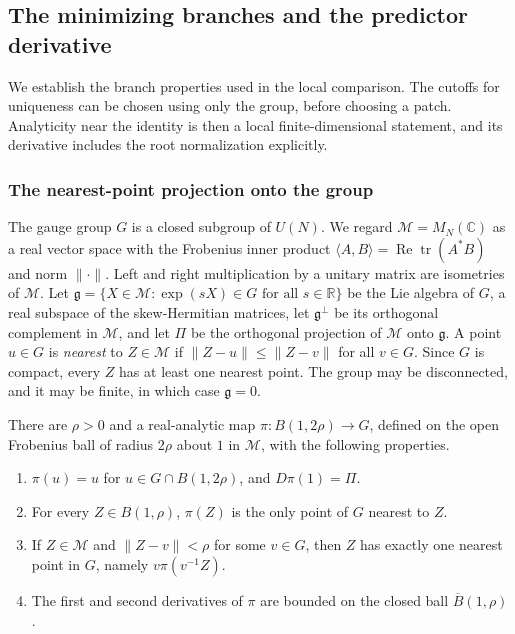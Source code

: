 \subsection{The minimizing branches and the predictor derivative}
\label{sec:predictor-branch}
We establish the branch properties used in the local comparison.
The cutoffs for uniqueness can be chosen using only the group, before
choosing a patch. Analyticity near the identity is then a local
finite-dimensional statement, and its derivative includes the root
normalization explicitly.

\subsubsection{The nearest-point projection onto the group}
The gauge group $G$ is a closed subgroup of $U(N)$. We regard
$\mathcal M=M_N(\mathbb C)$ as a real vector space with the Frobenius
inner product $\langle A,B\rangle=\operatorname{Re}\operatorname{tr}(A^*B)$
and norm $\|\cdot\|$. Left and right multiplication by a unitary
matrix are isometries of $\mathcal M$. Let
$\mathfrak g=\{X\in\mathcal M:\exp(sX)\in G\text{ for all }s\in\mathbb R\}$
be the Lie algebra of $G$, a real subspace of the skew-Hermitian
matrices, let $\mathfrak g^\perp$ be its orthogonal complement in
$\mathcal M$, and let $\Pi$ be the orthogonal projection of $\mathcal M$
onto $\mathfrak g$. A point $u\in G$ is \emph{nearest} to
$Z\in\mathcal M$ if $\|Z-u\|\le\|Z-v\|$ for all $v\in G$. Since $G$ is
compact, every $Z$ has at least one nearest point. The group may be
disconnected, and it may be finite, in which case $\mathfrak g=0$.

\begin{lemma}\label{lem:branch-nearest-projection}
There are $\rho>0$ and a real-analytic map
$\pi:B(1,2\rho)\to G$, defined on the open Frobenius ball of radius
$2\rho$ about $1$ in $\mathcal M$, with the following properties.
\begin{enumerate}
\item[(a)] $\pi(u)=u$ for $u\in G\cap B(1,2\rho)$, and $D\pi(1)=\Pi$.
\item[(b)] For every $Z\in B(1,\rho)$, $\pi(Z)$ is the only point of $G$
  nearest to $Z$.
\item[(c)] If $Z\in\mathcal M$ and $\|Z-v\|<\rho$ for some $v\in G$, then
  $Z$ has exactly one nearest point in $G$, namely $v\pi(v^{-1}Z)$.
\item[(d)] The first and second derivatives of $\pi$ are bounded on the
  closed ball $\overline B(1,\rho)$.
\end{enumerate}
\end{lemma}

